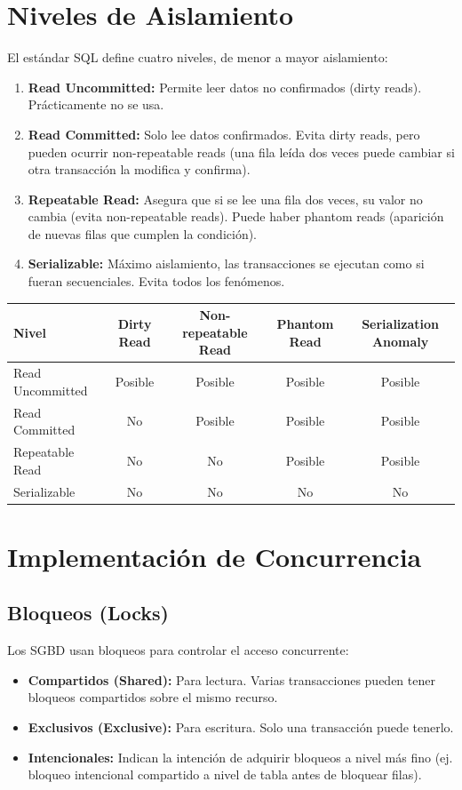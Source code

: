 \documentclass[12pt,a4paper,openany,oneside]{book}
\begin{document}
\section{Niveles de Aislamiento}
El estándar SQL define cuatro niveles, de menor a mayor aislamiento:

\begin{enumerate}
    \item \textbf{Read Uncommitted:} Permite leer datos no confirmados (dirty reads). Prácticamente no se usa.
    \item \textbf{Read Committed:} Solo lee datos confirmados. Evita dirty reads, pero pueden ocurrir non-repeatable reads (una fila leída dos veces puede cambiar si otra transacción la modifica y confirma).
    \item \textbf{Repeatable Read:} Asegura que si se lee una fila dos veces, su valor no cambia (evita non-repeatable reads). Puede haber phantom reads (aparición de nuevas filas que cumplen la condición).
    \item \textbf{Serializable:} Máximo aislamiento, las transacciones se ejecutan como si fueran secuenciales. Evita todos los fenómenos.
\end{enumerate}

\begin{center}
\begin{tabular}{|l|c|c|c|c|}
\hline
\textbf{Nivel} & \textbf{Dirty Read} & \textbf{Non-repeatable Read} & \textbf{Phantom Read} & \textbf{Serialization Anomaly} \\ \hline
Read Uncommitted & Posible & Posible & Posible & Posible \\
Read Committed & No & Posible & Posible & Posible \\
Repeatable Read & No & No & Posible & Posible \\
Serializable & No & No & No & No \\ \hline
\end{tabular}
\end{center}

\section{Implementación de Concurrencia}
\subsection{Bloqueos (Locks)}
Los SGBD usan bloqueos para controlar el acceso concurrente:
\begin{itemize}
    \item \textbf{Compartidos (Shared):} Para lectura. Varias transacciones pueden tener bloqueos compartidos sobre el mismo recurso.
    \item \textbf{Exclusivos (Exclusive):} Para escritura. Solo una transacción puede tenerlo.
    \item \textbf{Intencionales:} Indican la intención de adquirir bloqueos a nivel más fino (ej. bloqueo intencional compartido a nivel de tabla antes de bloquear filas).
\end{itemize}
\end{document}

